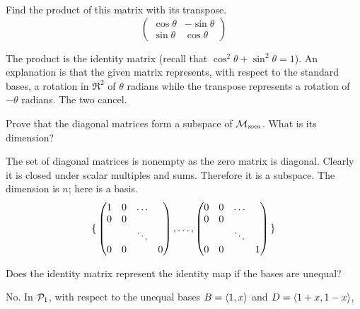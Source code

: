 \begin{exercises}
    Find the product of this matrix with its transpose.
    \begin{equation*}
      \begin{pmatrix}
        \cos\theta  &-\sin\theta  \\
        \sin\theta  &\cos\theta
      \end{pmatrix}
    \end{equation*}
    \begin{answer}
      The product is the identity matrix (recall that
      $\cos^2\theta+\sin^2\theta =1$).
      An explanation is that the given matrix represents, with respect to
      the standard bases, a rotation in \( \Re^2 \) of \( \theta \)
      radians while the transpose represents a rotation of \( -\theta \)
      radians.
      The two cancel.  
     \end{answer}
  \recommended \item 
    Prove that the diagonal matrices form a subspace of
    \( \mathcal{M}_{n \! \times \! n} \).
    What is its dimension?
    \begin{answer}
      The set of diagonal matrices is nonempty as the zero matrix is
      diagonal.
      Clearly it is closed under scalar multiples and sums.
      Therefore it is a subspace.
      The dimension is \( n \); here is a basis.
      \begin{equation*}
        \mbox{$\{\,\begin{pmatrix}
               1  &0  &\ldots    \\
               0  &0             \\
                  &   &\ddots    \\
               0  &0  &      &0
             \end{pmatrix},\ldots,
             \begin{pmatrix}
               0  &0  &\ldots    \\
               0  &0             \\
                  &   &\ddots    \\
               0  &0  &      &1
             \end{pmatrix}  \,\}$}
      \end{equation*} 
    \end{answer}
  \item 
    Does the identity matrix represent the identity map if the bases are
    unequal?
    \begin{answer}
      No.
      In \( \mathcal{P}_1 \), with respect to the unequal bases
      \( B=\langle1,x\rangle \) and \( D=\langle1+x,1-x\rangle \),

\end{answer}
\end{exercises}
